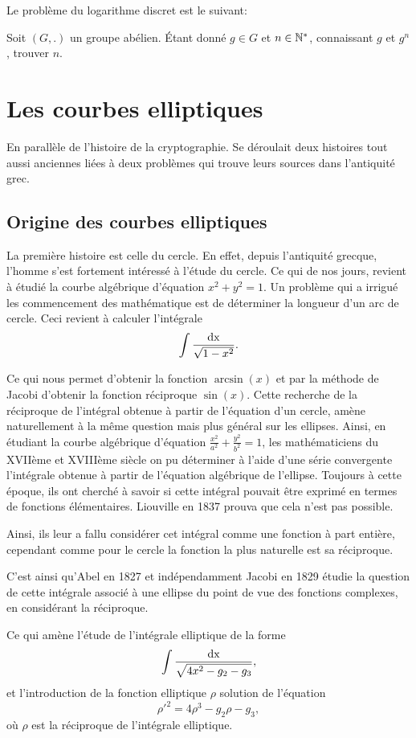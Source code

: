 Le problème du logarithme discret est le suivant: 

Soit $(G,.)$ un groupe abélien. Étant donné $g \in G$ et $n \in \mathbb{N}^*$, connaissant $g$ et
$g^{n}$, trouver $n$.

\section{Les courbes elliptiques}

En parallèle de l'histoire de la cryptographie. Se déroulait deux histoires tout aussi
anciennes liées à deux problèmes qui trouve leurs sources dans l'antiquité grec.

\subsection{Origine des courbes elliptiques}
La première histoire est celle du cercle. En effet, depuis l'antiquité grecque, l'homme
s'est fortement intéressé à l'étude du cercle. Ce qui de nos jours, revient à étudié la courbe
algébrique d'équation $x^2 + y^2 = 1$. Un problème qui a irrigué les commencement des
mathématique est de déterminer la longueur d'un arc de cercle. Ceci revient à calculer
l'intégrale
\[
\int \frac{\operatorname{dx}}{\sqrt{1-x^2} }
.\] 

Ce qui nous permet d'obtenir la fonction $\arcsin(x)$ et par la méthode de Jacobi d'obtenir la
fonction réciproque $\sin(x)$. Cette recherche de la réciproque de l'intégral obtenue
à partir de l'équation d'un cercle, amène naturellement à la même question mais plus général
sur les ellipses. Ainsi, en étudiant la courbe algébrique d'équation $ \frac{x^2}{a^2} +
\frac{y^2}{b^2} = 1$, les mathématiciens du XVIIème et XVIIIème siècle on pu déterminer
à l'aide d'une série convergente l'intégrale obtenue à partir de l'équation algébrique de
l'ellipse. Toujours à cette époque, ils ont cherché à savoir si cette intégral pouvait être
exprimé en termes de fonctions élémentaires. Liouville en 1837 prouva que cela n'est pas
possible.

Ainsi, ils leur a fallu considérer cet intégral comme une fonction à part entière,
cependant comme pour le cercle la fonction la plus naturelle est sa réciproque. 

C'est ainsi qu'Abel en 1827 et indépendamment Jacobi en 1829 étudie la question de cette
intégrale associé à une ellipse du point de vue des fonctions complexes, en considérant la
réciproque. 

Ce qui amène l'étude de l'intégrale elliptique de la forme
\[
\int \frac{\operatorname{dx}}{\sqrt{4x^2-g_2-g_3} }
,\] 
et l'introduction de la fonction elliptique $\rho$ solution de l'équation
\[
\rho'^2 = 4 \rho^3 - g_2 \rho - g_3
,\] 
où $\rho$ est la réciproque de l'intégrale elliptique.


